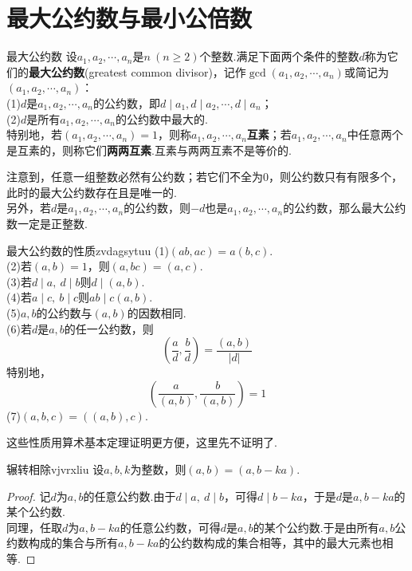 \documentclass[lang=cn, zihao=5]{elegantbook}
\newcommand{\ssb}[1]{\left( #1 \right)}
\begin{document}
\section{最大公约数与最小公倍数}

\begin{definition}{最大公约数}
	设$a_1,a_2, \cdots ,a_n$是$n~(n \geq 2)$个整数.满足下面两个条件的整数$d$称为它们的\textbf{最大公约数}(greatest common divisor)，记作$\gcd (a_1,a_2, \cdots ,a_n)$或简记为$(a_1,a_2, \cdots ,a_n)$： \\
	(1)$d$是$a_1,a_2, \cdots ,a_n$的公约数，即$d \mid a_1,d \mid a_2, \cdots ,d \mid a_n$； \\
	(2)$d$是所有$a_1,a_2, \cdots ,a_n$的公约数中最大的. \\
	特别地，若$(a_1,a_2, \cdots ,a_n)=1$，则称$a_1,a_2, \cdots ,a_n$\textbf{互素}；若$a_1,a_2, \cdots ,a_n$中任意两个是互素的，则称它们\textbf{两两互素}.互素与两两互素不是等价的.
\end{definition}
\begin{remark}
	注意到，任意一组整数必然有公约数；若它们不全为$0$，则公约数只有有限多个，此时的最大公约数存在且是唯一的.\\ 
	另外，若$d$是$a_1,a_2, \cdots ,a_n$的公约数，则$-d$也是$a_1,a_2, \cdots ,a_n$的公约数，那么最大公约数一定是正整数.
\end{remark}

\begin{theorem}{最大公约数的性质}{zvdagsytuu}
	(1)$(ab,ac)=a(b,c)$. \\ 
	(2)若$(a,b)=1$，则$(a,bc)=(a,c)$. \\
	(3)若$d \mid a,~d \mid b$则$d \mid (a,b)$. \\
	(4)若$a \mid c,~b \mid c$则$ab \mid c(a,b)$. \\
	(5)$a,b$的公约数与$(a,b)$的因数相同. \\
	(6)若$d$是$a,b$的任一公约数，则$$\ssb{\frac{a}{d},\frac{b}{d}} = \frac{(a,b)}{|d|}$$
	特别地，$$\ssb{\frac{a}{(a,b)},\frac{b}{(a,b)}}=1$$
	(7)$(a,b,c)=((a,b),c)$.
\end{theorem}
\begin{remark}
	这些性质用算术基本定理证明更方便，这里先不证明了.
\end{remark}

\begin{theorem}{辗转相除}{vjvrxliu}
	设$a,b,k$为整数，则$(a,b)=(a,b-ka)$.
\end{theorem}
\begin{proof}
	记$d$为$a,b$的任意公约数.由于$d \mid a,~d \mid b$，可得$d \mid b-ka$，于是$d$是$a,b-ka$的某个公约数. \\
	同理，任取$d$为$a,b-ka$的任意公约数，可得$d$是$a,b$的某个公约数.于是由所有$a,b$公约数构成的集合与所有$a,b-ka$的公约数构成的集合相等，其中的最大元素也相等.
\end{proof}
\end{document}
